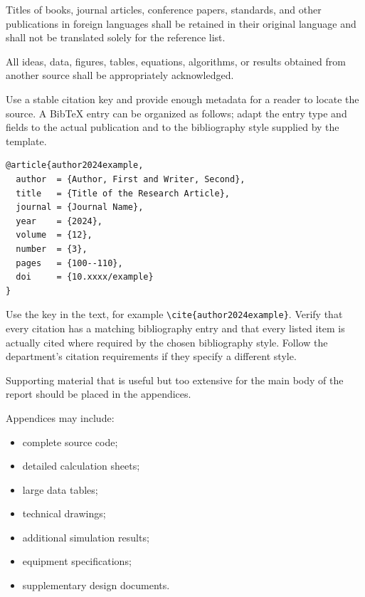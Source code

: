 {Titles of books, journal articles, conference papers, standards,
and other publications in foreign languages shall be retained in
their original language and shall not be translated solely for the
reference list.

All ideas, data, figures, tables, equations, algorithms, or results
obtained from another source shall be appropriately acknowledged.


Use a stable citation key and provide enough metadata for a reader to
locate the source. A BibTeX entry can be organized as follows; adapt
the entry type and fields to the actual publication and to the
bibliography style supplied by the template.

\begin{verbatim}
@article{author2024example,
  author  = {Author, First and Writer, Second},
  title   = {Title of the Research Article},
  journal = {Journal Name},
  year    = {2024},
  volume  = {12},
  number  = {3},
  pages   = {100--110},
  doi     = {10.xxxx/example}
}
\end{verbatim}

Use the key in the text, for example \verb|\cite{author2024example}|.
Verify that every citation has a matching bibliography entry and that
every listed item is actually cited where required by the chosen
bibliography style. Follow the department's citation requirements if
they specify a different style.

\vspace{0.3cm}



Supporting material that is useful but too extensive for the main
body of the report should be placed in the appendices.

Appendices may include:

\begin{itemize}[leftmargin=0.8cm, itemsep=2pt]
    \item complete source code;
    \item detailed calculation sheets;
    \item large data tables;
    \item technical drawings;
    \item additional simulation results;
    \item equipment specifications;
    \item supplementary design documents.
\end{itemize}

}
